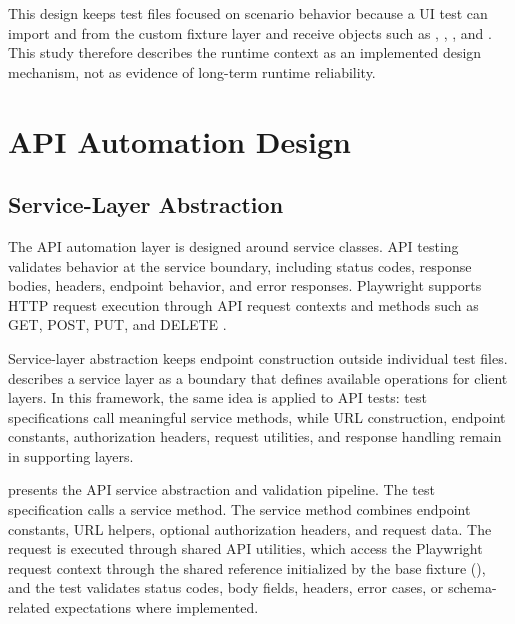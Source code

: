 This design keeps test files focused on scenario behavior because a UI test can import  and  from the custom fixture layer and receive objects such as , , , and . This study therefore describes the runtime context as an implemented design mechanism, not as evidence of long-term runtime reliability.

\section{API Automation Design}
\label{sec:ch3-api-automation-design}

\subsection{Service-Layer Abstraction}
\label{subsec:ch3-service-layer-abstraction}

The API automation layer is designed around service classes. API testing validates behavior at the service boundary, including status codes, response bodies, headers, endpoint behavior, and error responses. Playwright supports HTTP request execution through API request contexts and methods such as GET, POST, PUT, and DELETE \autocite{playwright_docs_api_testing_2026,playwright_docs_apirequestcontext_2026}.

Service-layer abstraction keeps endpoint construction outside individual test files. \textcite{fowler_service_layer_2003} describes a service layer as a boundary that defines available operations for client layers. In this framework, the same idea is applied to API tests: test specifications call meaningful service methods, while URL construction, endpoint constants, authorization headers, request utilities, and response handling remain in supporting layers.

 presents the API service abstraction and validation pipeline. The test specification calls a service method. The service method combines endpoint constants, URL helpers, optional authorization headers, and request data. The request is executed through shared API utilities, which access the Playwright request context through the shared  reference initialized by the base fixture (), and the test validates status codes, body fields, headers, error cases, or schema-related expectations where implemented.

